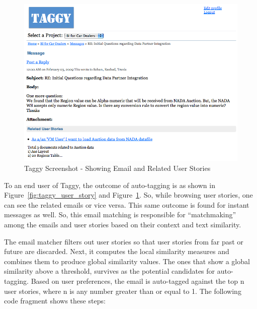 	
\begin{figure}[tb]
	\centering
	\includegraphics[width=\textwidth]{taggy_email.png}
    \caption{Taggy Screenshot - Showing Email and Related User Stories}
	\label{fig:taggy_email}
\end{figure}

To an end user of Taggy, the outcome of auto-tagging is as shown in Figure~\ref{fig:taggy_user_story} and Figure~\ref{fig:taggy_email}. So, while browsing user stories, one can see the related emails or vice versa. This same outcome is found for instant messages as well. So, this email matching is responsible for ``matchmaking'' among the emails and user stories based on their context and text similarity.

The email matcher filters out user stories so that user stories from far past or future are discarded. Next, it computes the local similarity measures and combines them  to produce global similarity values. The ones that show a global similarity above a threshold, survives as the potential candidates for auto-tagging. Based on user preferences, the email is auto-tagged against the top n user stories, where n is any number greater than or equal to 1. The following code fragment shows these steps:

